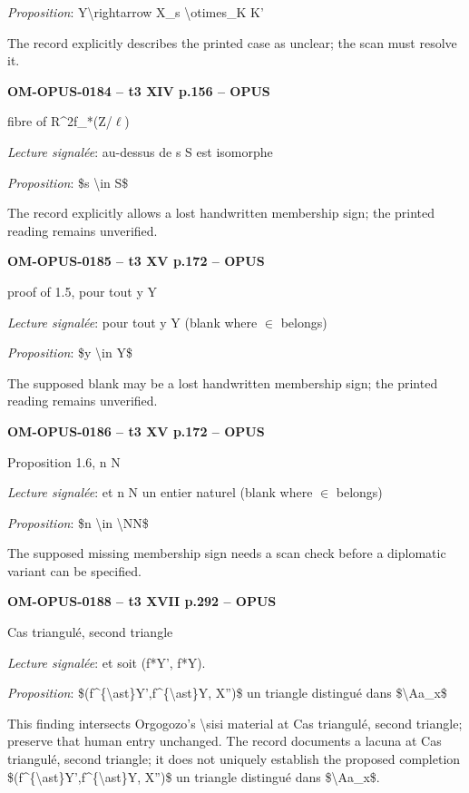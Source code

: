 \emph{Proposition}: Y\textbackslash{}rightarrow X\_s \textbackslash{}otimes\_K K'\par
The record explicitly describes the printed case as unclear; the scan must resolve it.\par
\par\noindent\textbf{OM-OPUS-0184 -- t3 XIV p.156 -- OPUS}\par
fibre of R\textasciicircum{}2f\_*(Z/\ensuremath{\ell})\par
\emph{Lecture signalée}: au-dessus de s S est isomorphe\par
\emph{Proposition}: \$s \textbackslash{}in S\$\par
The record explicitly allows a lost handwritten membership sign; the printed reading remains unverified.\par
\par\noindent\textbf{OM-OPUS-0185 -- t3 XV p.172 -- OPUS}\par
proof of 1.5, pour tout y Y\par
\emph{Lecture signalée}: pour tout y Y (blank where \ensuremath{\in} belongs)\par
\emph{Proposition}: \$y \textbackslash{}in Y\$\par
The supposed blank may be a lost handwritten membership sign; the printed reading remains unverified.\par
\par\noindent\textbf{OM-OPUS-0186 -- t3 XV p.172 -- OPUS}\par
Proposition 1.6, n N\par
\emph{Lecture signalée}: et n N un entier naturel (blank where \ensuremath{\in} belongs)\par
\emph{Proposition}: \$n \textbackslash{}in \textbackslash{}NN\$\par
The supposed missing membership sign needs a scan check before a diplomatic variant can be specified.\par
\par\noindent\textbf{OM-OPUS-0188 -- t3 XVII p.292 -- OPUS}\par
Cas triangulé, second triangle\par
\emph{Lecture signalée}: et soit (f*Y', f*Y).\par
\emph{Proposition}: \$(f\textasciicircum{}\{\textbackslash{}ast\}Y',f\textasciicircum{}\{\textbackslash{}ast\}Y, X'')\$ un triangle distingué dans \$\textbackslash{}Aa\_x\$\par
This finding intersects Orgogozo's \textbackslash{}sisi material at Cas triangulé, second triangle; preserve that human entry unchanged. The record documents a lacuna at Cas triangulé, second triangle; it does not uniquely establish the proposed completion \$(f\textasciicircum{}\{\textbackslash{}ast\}Y',f\textasciicircum{}\{\textbackslash{}ast\}Y, X'')\$ un triangle distingué dans \$\textbackslash{}Aa\_x\$.\par
